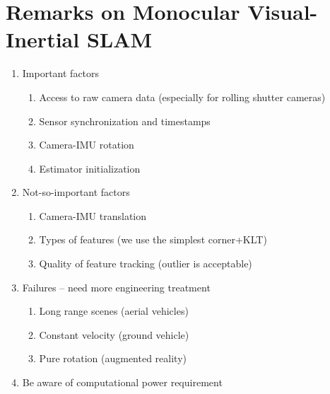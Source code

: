 \documentclass[12pt,a4paper]{article}
\begin{document}
\section{Remarks on Monocular Visual-Inertial SLAM}

\begin{enumerate}
\item Important factors
  \begin{enumerate}
  \item Access to raw camera data (especially for rolling shutter cameras)
  \item Sensor synchronization and timestamps
  \item Camera-IMU rotation
  \item Estimator initialization
  \end{enumerate}
\item Not-so-important factors
  \begin{enumerate}
  \item Camera-IMU translation
  \item Types of features (we use the simplest corner+KLT)
  \item Quality of feature tracking (outlier is acceptable)
  \end{enumerate}
\item Failures – need more engineering treatment
  \begin{enumerate}
  \item Long range scenes (aerial vehicles)
  \item Constant velocity (ground vehicle)
  \item Pure rotation (augmented reality)
  \end{enumerate}
\item Be aware of computational power requirement
\end{enumerate}



\printindex
\end{document}
